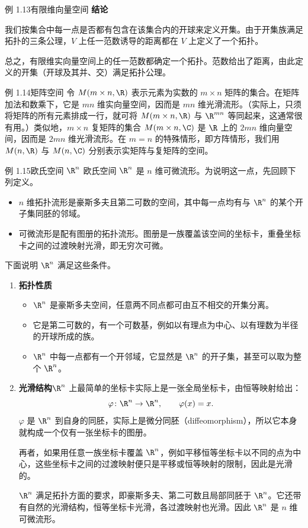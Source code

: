 \begin{statement}{例 1.13}{有限维向量空间}
\textbf{结论}\par
我们按集合中每一点是否都有包含在该集合内的开球来定义开集。由于开集族满足拓扑的三条公理，$V$ 上任一范数诱导的距离都在 $V$ 上定义了一个拓扑。

总之，有限维实向量空间上的任一范数都确定一个拓扑。范数给出了距离，由此定义的开集（开球及其并、交）满足拓扑公理。
\end{statement}

\begin{statement}{例 1.14}{矩阵空间}
令 $M(m\times n,\R)$ 表示元素为实数的 $m\times n$ 矩阵的集合。在矩阵加法和数乘下，它是 $mn$ 维实向量空间，因而是 $mn$ 维光滑流形。（实际上，只须将矩阵的所有元素排成一行，就可将 $M(m\times n,\R)$ 与 $\R^{mn}$ 等同起来，这通常很有用。）类似地，$m\times n$ 复矩阵的集合 $M(m\times n,\C)$ 是 $\R$ 上的 $2mn$ 维向量空间，因而是 $2mn$ 维光滑流形。在 $m=n$ 的特殊情形，即方阵情形，我们用 $M(n,\R)$ 与 $M(n,\C)$ 分别表示实矩阵与复矩阵的空间。
\end{statement}

\begin{statement}{例 1.15}{欧氏空间 $\R^n$}
欧氏空间 $\R^n$ 是 $n$ 维可微流形。为说明这一点，先回顾下列定义。
\begin{itemize}
  \item $n$ 维拓扑流形是豪斯多夫且第二可数的空间，其中每一点均有与 $\R^n$ 的某个开子集同胚的邻域。
  \item 可微流形是配有图册的拓扑流形。图册是一族覆盖该空间的坐标卡，重叠坐标卡之间的过渡映射光滑，即无穷次可微。
\end{itemize}
下面说明 $\R^n$ 满足这些条件。
\begin{enumerate}
  \item \textbf{拓扑性质}
  \begin{itemize}
    \item $\R^n$ 是豪斯多夫空间，任意两不同点都可由互不相交的开集分离。
    \item 它是第二可数的，有一个可数基，例如以有理点为中心、以有理数为半径的开球所成的族。
    \item $\R^n$ 中每一点都有一个开邻域，它显然是 $\R^n$ 的开子集，甚至可以取为整个 $\R^n$。
  \end{itemize}
  \item \textbf{光滑结构}\quad $\R^n$ 上最简单的坐标卡实际上是一张全局坐标卡，由恒等映射给出：
  \[
    \varphi\colon\R^n\to\R^n,\qquad \varphi(x)=x.
  \]
  $\varphi$ 是 $\R^n$ 到自身的同胚，实际上是微分同胚（diffeomorphism），所以它本身就构成一个仅有一张坐标卡的图册。

  再者，如果用任意一族坐标卡覆盖 $\R^n$，例如平移恒等坐标卡以不同的点为中心，这些坐标卡之间的过渡映射便只是平移或恒等映射的限制，因此是光滑的。

  $\R^n$ 满足拓扑方面的要求，即豪斯多夫、第二可数且局部同胚于 $\R^n$。它还带有自然的光滑结构，恒等坐标卡光滑，各过渡映射也光滑。因此 $\R^n$ 是 $n$ 维可微流形。
\end{enumerate}
\end{statement}

